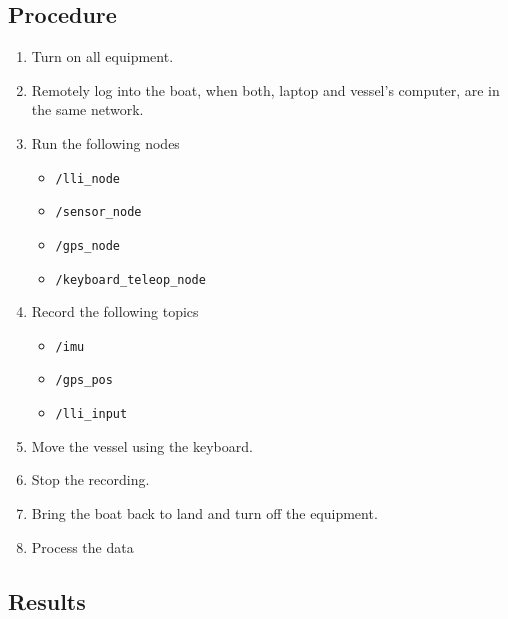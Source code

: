 \subsection*{Procedure}
\begin{enumerate}
	\item Turn on all equipment.
    \item Remotely log into the boat, when both, laptop and vessel's computer, are in the same network.
	\item Run the following nodes
		\begin{itemize}
			\item \lstinline[style=cinline]{/lli_node}
            \item \lstinline[style=cinline]{/sensor_node}
            \item \lstinline[style=cinline]{/gps_node}
			\item \lstinline[style=cinline]{/keyboard_teleop_node}
		\end{itemize}
    \item Record the following topics
        \begin{itemize}
            \item \lstinline[style=cinline]{/imu}
            \item \lstinline[style=cinline]{/gps_pos}
            \item \lstinline[style=cinline]{/lli_input}        
        \end{itemize}
	\item Move the vessel using the keyboard.
	\item Stop the recording.
    \item Bring the boat back to land and turn off the equipment.
    \item Process the data
\end{enumerate}


\subsection*{Results}
